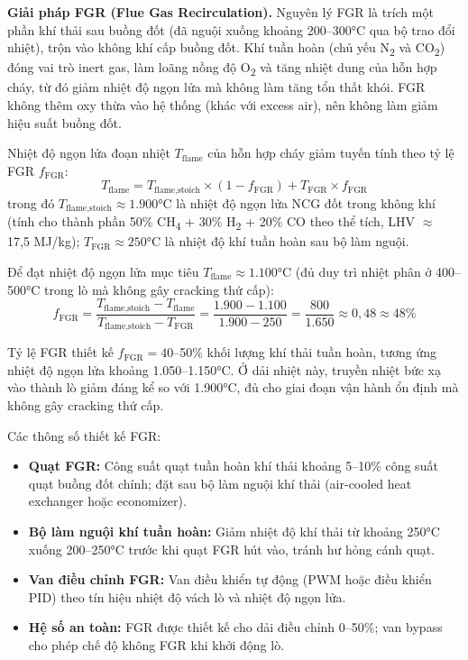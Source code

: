\documentclass[../main.tex]{subfiles}
\begin{document}
\textbf{Giải pháp FGR (Flue Gas Recirculation).} Nguyên lý FGR là trích một phần khí thải sau buồng đốt (đã nguội xuống khoảng 200--300°C qua bộ trao đổi nhiệt), trộn vào không khí cấp buồng đốt. Khí tuần hoàn (chủ yếu N\textsubscript{2} và CO\textsubscript{2}) đóng vai trò inert gas, làm loãng nồng độ O\textsubscript{2} và tăng nhiệt dung của hỗn hợp cháy, từ đó giảm nhiệt độ ngọn lửa mà không làm tăng tổn thất khói. FGR không thêm oxy thừa vào hệ thống (khác với excess air), nên không làm giảm hiệu suất buồng đốt.

Nhiệt độ ngọn lửa đoạn nhiệt $T_{\text{flame}}$ của hỗn hợp cháy giảm tuyến tính theo tỷ lệ FGR $f_{\text{FGR}}$:
\begin{equation}
  T_{\text{flame}} = T_{\text{flame,stoich}} \times \left(1 - f_{\text{FGR}}\right) + T_{\text{FGR}} \times f_{\text{FGR}}
  \label{eq:fgr-flame-temp}
\end{equation}
trong đó $T_{\text{flame,stoich}} \approx 1.900$°C là nhiệt độ ngọn lửa NCG đốt trong không khí (tính cho thành phần 50\% CH\textsubscript{4} + 30\% H\textsubscript{2} + 20\% CO theo thể tích, LHV $\approx$ 17,5 MJ/kg); $T_{\text{FGR}} \approx 250$°C là nhiệt độ khí tuần hoàn sau bộ làm nguội.

Để đạt nhiệt độ ngọn lửa mục tiêu $T_{\text{flame}} \approx 1.100$°C (đủ duy trì nhiệt phân ở 400--500°C trong lò mà không gây cracking thứ cấp):
\begin{equation}
  f_{\text{FGR}} = \frac{T_{\text{flame,stoich}} - T_{\text{flame}}}{T_{\text{flame,stoich}} - T_{\text{FGR}}}
  = \frac{1.900 - 1.100}{1.900 - 250}
  = \frac{800}{1.650} \approx 0{,}48 \approx 48\%
\end{equation}

Tỷ lệ FGR thiết kế $f_{\text{FGR}} = 40$--50\% khối lượng khí thải tuần hoàn, tương ứng nhiệt độ ngọn lửa khoảng 1.050--1.150°C. Ở dải nhiệt này, truyền nhiệt bức xạ vào thành lò giảm đáng kể so với 1.900°C, đủ cho giai đoạn vận hành ổn định mà không gây cracking thứ cấp.

Các thông số thiết kế FGR:
\begin{itemize}
  \item \textbf{Quạt FGR:} Công suất quạt tuần hoàn khí thải khoảng 5--10\% công suất quạt buồng đốt chính; đặt sau bộ làm nguội khí thải (air-cooled heat exchanger hoặc economizer).
  \item \textbf{Bộ làm nguội khí tuần hoàn:} Giảm nhiệt độ khí thải từ khoảng 250°C xuống 200--250°C trước khi quạt FGR hút vào, tránh hư hỏng cánh quạt.
  \item \textbf{Van điều chỉnh FGR:} Van điều khiển tự động (PWM hoặc điều khiển PID) theo tín hiệu nhiệt độ vách lò và nhiệt độ ngọn lửa.
  \item \textbf{Hệ số an toàn:} FGR được thiết kế cho dải điều chỉnh 0--50\%; van bypass cho phép chế độ không FGR khi khởi động lò.
\end{itemize}
\end{document}
